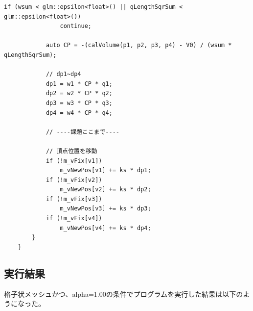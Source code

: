 \documentclass[a4paper,10pt,uplatex,dvipdfmx]{jsarticle}
\begin{document}
\begin{lstlisting}[caption=pbd.cppのprojectVolumeConstraint関数]
			if (wsum < glm::epsilon<float>() || qLengthSqrSum < glm::epsilon<float>())
				continue;
	
			auto CP = -(calVolume(p1, p2, p3, p4) - V0) / (wsum * qLengthSqrSum);
	
			// dp1~dp4
			dp1 = w1 * CP * q1;
			dp2 = w2 * CP * q2;
			dp3 = w3 * CP * q3;
			dp4 = w4 * CP * q4;
	
			// ----課題ここまで----
	
			// 頂点位置を移動
			if (!m_vFix[v1])
				m_vNewPos[v1] += ks * dp1;
			if (!m_vFix[v2])
				m_vNewPos[v2] += ks * dp2;
			if (!m_vFix[v3])
				m_vNewPos[v3] += ks * dp3;
			if (!m_vFix[v4])
				m_vNewPos[v4] += ks * dp4;
		}
	}
\end{lstlisting}

\subsection{実行結果}
格子状メッシュかつ、alpha=1.00の条件でプログラムを実行した結果は以下のようになった。
\end{document}
